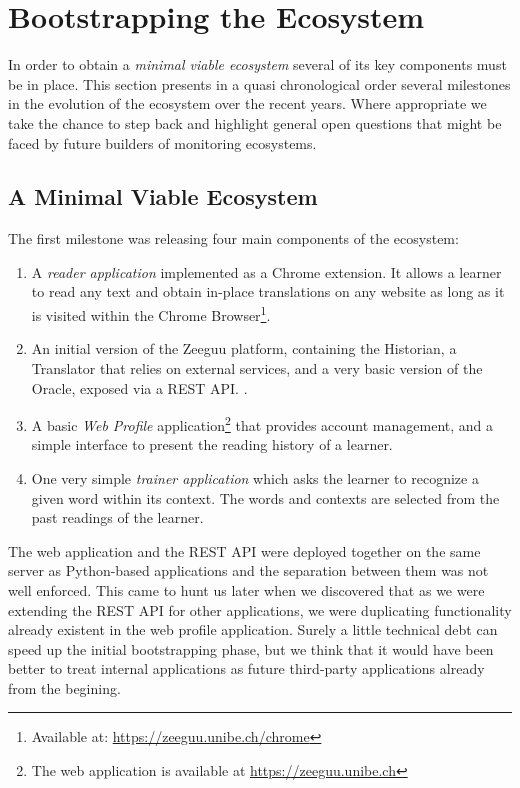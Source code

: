 

\section {Bootstrapping the Ecosystem}

In order to obtain a {\em minimal viable ecosystem} several of its key components must be in place. This section presents in a quasi chronological order several milestones in the evolution of the  ecosystem over the recent years. Where appropriate we take the chance to step back and highlight general open questions that might be faced by future builders of monitoring ecosystems. 

\subsection {A Minimal Viable Ecosystem}
The first milestone was releasing four main components of the ecosystem: 

\begin{enumerate}
	\item A {\em reader application} implemented as a Chrome extension. It allows a learner to read any text and obtain in-place translations on any website as long as it is visited within the Chrome Browser\footnote{Available at: \url{https://zeeguu.unibe.ch/chrome}}. 

	\item An initial version of the Zeeguu platform, containing the Historian, a Translator that relies on external services, and a very basic version of the Oracle, exposed via a REST API. \cite{Lung16zeeguu}. 

	\item A basic {\em Web Profile} application\footnote{The web application is available at \url{https://zeeguu.unibe.ch}} that provides account management, and a simple interface to present the reading history of a learner. 

	\item One very simple {\em trainer application} which asks the learner to recognize a given word within its context. The words and contexts are selected from the past readings of the learner.

\end{enumerate}

The web application and the REST API were deployed together on the same server as Python-based applications and the separation between them was not well enforced. This came to hunt us later when we discovered that as we were extending the REST API for other applications, we were duplicating functionality already existent in the web profile application. Surely a little technical debt can speed up the initial bootstrapping phase, but we think that it would have been better to treat internal applications as future third-party applications already from the begining.  


